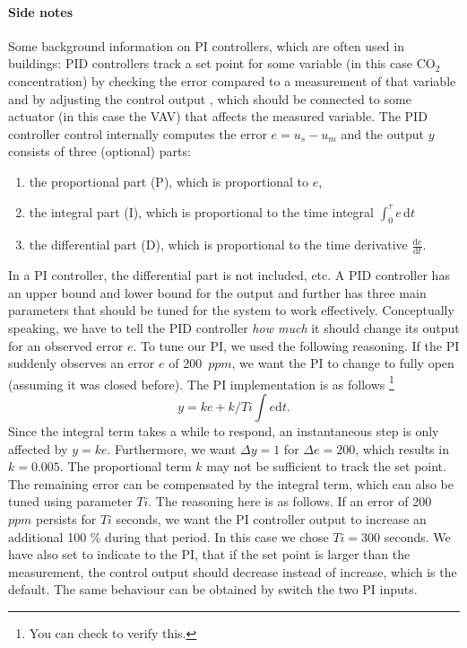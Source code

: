 \documentclass[10pt,a4paper]{article}
\begin{document}
\paragraph{Side notes}
Some background information on PI controllers, 
which are often used in buildings: 
PID controllers track a set point for some variable (in this case CO$_2$ concentration)  
by checking the error compared to a measurement of that variable 
and by adjusting the control output , which should be connected
to some actuator (in this case the VAV) that affects the measured variable.
The PID controller control internally computes the error $e=u_s-u_m$
and the output $y$ consists of three (optional) parts: 
\begin{enumerate}
\item the proportional part (P), which is proportional to $e$,
\item the integral part (I), which is proportional to the time integral $\int_0^\tau e \, \mathrm{d}t$
\item the differential part (D), which is proportional to the time derivative $\frac{ \mathrm{d} e}{ \mathrm{d} t}$.
\end{enumerate}
In a PI controller, the differential part is not included, etc.
A PID controller has an upper bound and lower bound for the output 
and further has three main parameters that should be tuned
for the system to work effectively.
Conceptually speaking, we have to tell the PID controller \textit{how much} it
should change its output for an observed error $e$.
To tune our PI, we used the following reasoning.
If the PI suddenly observes an error $e$ of 200~$ppm$,
we want the PI to change to fully open (assuming it was closed before).
The PI implementation is as follows 
\footnote{You can check  to verify this.}
\begin{equation}
y = ke + k/Ti\int e\mathrm{d}t.
\end{equation}
Since the integral term takes a while to respond,
an instantaneous step is only affected by $y=ke$.
Furthermore, we want $\Delta y = 1$  for $\Delta e = 200$,
which results in $k=0.005$.
The proportional term $k$ may not be sufficient
to track the set point. 
The remaining error can be compensated by the integral term, 
which can also be tuned using parameter $Ti$.
The reasoning here is as follows.
If an error of 200~$ppm$ persists for $Ti$ seconds,
we want the PI controller output to increase an additional 100 \% 
during that period.
In this case we chose $Ti=300$ seconds.
We have also set  to indicate to the PI,
that if the set point is larger than the measurement, the control output should
decrease instead of increase, which is the default. The same behaviour
can be obtained by  switch the two PI inputs.\\
\end{document}
